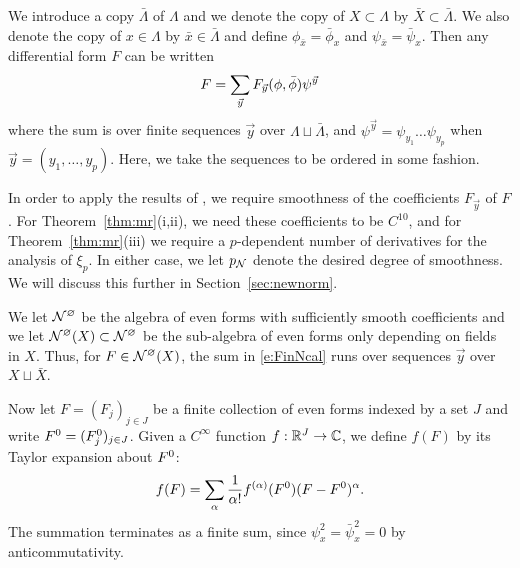 We introduce a copy $\bar\Lambda$ of $\Lambda$
and we denote the copy of $X \subset \Lambda$ by $\bar X \subset \bar\Lambda$.
We also denote the copy of $x \in \Lambda$
by $\bar x \in \bar\Lambda$ and define $\phi_{\bar x} = \bar\phi_x$ and $\psi_{\bar x} = \bar\psi_x$.
Then any differential form $F$ can be written
\begin{equation}
\lbeq{FinNcal}
F
=
\sum_{\vec y}
F_{\vec y} (\phi, \bar\phi)
\psi^{\vec y}
\end{equation}
where the sum is over finite sequences $\vec y$ over $\Lambda\sqcup\bar\Lambda$,
and $\psi^{\vec y} = \psi_{y_1} \ldots \psi_{y_p}$
when $\vec y = (y_1, \ldots, y_p)$. Here, we take the sequences to be ordered in
some  fashion.

In order to apply the results of \cite{BBS-saw4-log,BBS-saw4,BSTW-clp}, we require
smoothness of the coefficients $F_{\vec y}$ of $F$.  For Theorem~\ref{thm:mr}(i,ii),
we need these coefficients to be $C^{10}$, and for Theorem~\ref{thm:mr}(iii) we require
a $p$-dependent number of derivatives for the analysis of $\xi_p$.
In either case, we let $p_{\mathcal{N}}$ denote the desired degree of smoothness.
We will discuss this further in Section~\ref{sec:newnorm}.

We let $\mathcal{N}^\varnothing$ be the algebra of even forms  with sufficiently smooth coefficients
and we let $\mathcal{N}^\varnothing(X) \subset \mathcal{N}^\varnothing$ be the sub-algebra of even forms only depending on fields
in $X$. Thus, for $F \in \mathcal{N}^\varnothing(X)$, the sum in \eqref{e:FinNcal} runs over sequences
$\vec y$ over $X \sqcup \bar X$.

Now let $F = (F_j)_{j \in J}$ be a finite collection of even forms
indexed by a set $J$
and write $F^0 = (F^0_j)_{j \in J}$.
Given a $C^\infty$ function $f : {\mathbb R}^J \rightarrow \mathbb{C}$, we define
$f(F)$ by its Taylor expansion about $F^0$:
\begin{equation}
f(F) = \sum_\alpha \frac{1}{\alpha!} f^{(\alpha)}(F^0) (F - F^0)^\alpha.
\end{equation}
The summation terminates as a finite sum, since $\psi_x^2 = \bar\psi_x^2 = 0$
by anticommutativity.

